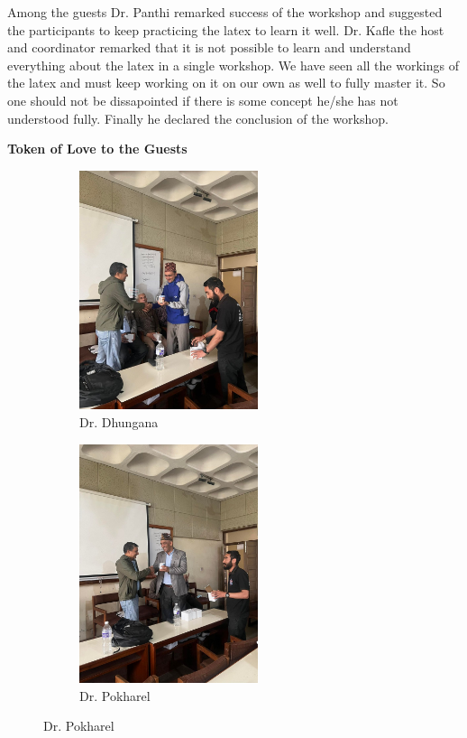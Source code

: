\documentclass[a4paper,12pt]{report}
\begin{document}
\vspace{7mm}
Among the guests Dr. Panthi remarked success of the workshop and suggested the participants to keep practicing the latex to learn it well. Dr. Kafle the host and coordinator remarked that it is not possible to learn and understand everything about the latex in a single workshop. We have seen all the workings of the latex and must keep working on it on our own as well to fully master it. So one should not be dissapointed if there is some concept he/she has not understood fully. Finally he declared the conclusion of the workshop.
\clearpage

\vspace*{5mm}
{\bfseries \large Token of Love to the Guests}
\vspace{3mm}
\begin{figure}[h!]
\centering
\begin{subfigure}[c]{0.33\textwidth}
  \includegraphics[height=7cm, width=\textwidth]{rcdt.jpg}
  \caption{Dr. Dhungana}
\end{subfigure}
\hfill
\begin{subfigure}[t]{0.33\textwidth}
  \includegraphics[height=7cm, width=\textwidth]{puskart.jpg}
  \caption{Dr. Pokharel}

\end{subfigure}
\end{figure}
\end{document}
